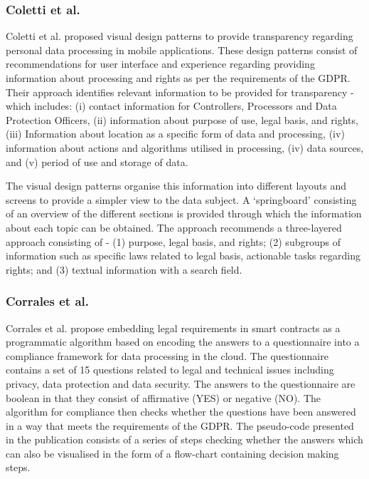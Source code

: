\subsubsection{Coletti et al.}
Coletti et al. \cite{kurosu_design_2019} proposed visual design patterns to provide transparency regarding personal data processing in mobile applications. These design patterns consist of recommendations for user interface and experience regarding providing information about processing and rights as per the requirements of the GDPR. Their approach identifies relevant information to be provided for transparency - which includes: (i) contact information for Controllers, Processors and Data Protection Officers, (ii) information about purpose of use, legal basis, and rights, (iii) Information about location as a specific form of data and processing, (iv) information about actions and algorithms utilised in processing, (iv) data sources, and (v) period of use and storage of data.

The visual design patterns organise this information into different layouts and screens to provide a simpler view to the data subject. A `springboard' consisting of an overview of the different sections is provided through which the information about each topic can be obtained. The approach recommends a three-layered approach consisting of - (1) purpose, legal basis, and rights; (2) subgroups of information such as specific laws related to legal basis, actionable tasks regarding rights; and (3) textual information with a search field.

\subsubsection{Corrales et al.}
Corrales et al. \cite{corrales_smart_2019} propose embedding legal requirements in smart contracts as a programmatic algorithm based on encoding the answers to a questionnaire into a compliance framework for data processing in the cloud. The questionnaire contains a set of 15 questions related to legal and technical issues including privacy, data protection and data security. The answers to the questionnaire are boolean in that they consist of affirmative (YES) or negative (NO). The algorithm for compliance then checks whether the questions have been answered in a way that meets the requirements of the GDPR. The pseudo-code presented in the publication consists of a series of steps checking whether the answers which can also be visualised in the form of a flow-chart containing decision making steps.

